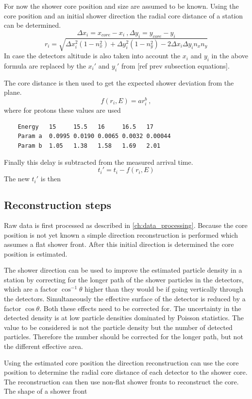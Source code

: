 For now the shower core position and size are assumed to be known. Using the core position and an initial shower direction the radial core distance of a station can be determined.
%
\begin{equation}
    \Delta x_i = x_{core} - x_i \ ,
    \Delta y_i = y_{core} - y_i
\end{equation}
%
\begin{equation}
    r_i = \sqrt{\Delta x_i^2 (1 - n_x^2) + \Delta y_i^2 (1 - n_y^2) -
                2 \Delta x_i \Delta y_i n_x n_y}
\end{equation}
%
In case the detectors altitude is also taken into account the $x_i$ and $y_i$ in the above formula are replaced by the $x_i'$ and $y_i'$ from [ref prev subsection equations].

The core distance is then used to get the expected shower deviation from the plane.
%
\begin{equation}
    f(r_i, E) = a r_i^b \ ,
\end{equation}
%
where for protons these values are used
%
\begin{verbatim}
    Energy   15     15.5   16     16.5   17
    Param a  0.0995 0.0190 0.0065 0.0032 0.00044
    Param b  1.05   1.38   1.58   1.69   2.01
\end{verbatim}
%
Finally this delay is subtracted from the measured arrival time.
%
\begin{equation}
    t_i' = t_i - f(r_i, E)
\end{equation}
%
The new $t_i'$ is then


\subsection{Reconstruction steps}

Raw data is first processed as described in \cref{ch:data_processing}. Because the core position is not yet known a simple direction reconstruction is performed which assumes a flat shower front. After this initial direction is determined the core position is estimated.

The shower direction can be used to improve the estimated particle density in a station by correcting for the longer path of the shower particles in the detectors, which are a factor $\cos^{-1} \theta$ higher than they would be if going vertically through the detectors. Simultaneously the effective surface of the detector is reduced by a factor $\cos \theta$. Both these effects need to be corrected for. The uncertainty in the detected density is at low particle densities dominated by Poisson statistics. The value to be considered is not the particle density but the number of detected particles. Therefore the number should be corrected for the longer path, but not the different effective area.

Using the estimated core position the direction reconstruction can use the core position to determine the radial core distance of each detector to the shower core. The reconstruction can then use non-flat shower fronts to reconstruct the core. The shape of a shower front

